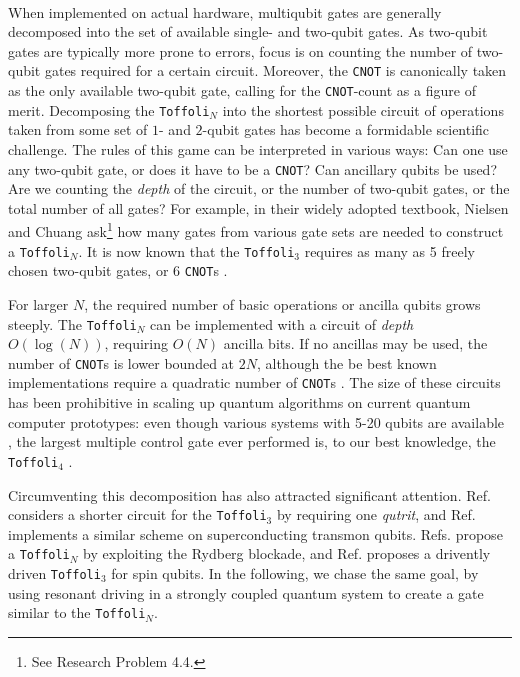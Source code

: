 \paragraph{} When implemented on actual hardware, multiqubit gates are generally decomposed into the set of available single- and two-qubit gates. As two-qubit gates are typically more prone to errors, focus is on counting the number of two-qubit gates required for a certain circuit. Moreover, the \texttt{CNOT} is canonically taken as the only available two-qubit gate, calling for the \texttt{CNOT}-count as a figure of merit. Decomposing the \texttt{Toffoli}$_N$ into the shortest possible circuit of operations taken from some set of $1$- and $2$-qubit gates has become a formidable scientific challenge. The rules of this game can be interpreted in various ways: Can one use any two-qubit gate, or does it have to be a \texttt{CNOT}? Can ancillary qubits be used? Are we counting the \emph{depth} of the circuit, or the number of two-qubit gates, or the total number of all gates?
For example, in their widely adopted textbook, Nielsen and Chuang \cite{Nielsen2010} ask\footnote{See Research Problem 4.4.} how many gates from various gate sets are needed to construct a \texttt{Toffoli}$_N$. It is now known that the \texttt{Toffoli}$_3$ requires as many as 5 freely chosen two-qubit gates, or 6 \texttt{CNOT}s \cite{Yu2013}. 

For larger $N$, the required number of basic operations or ancilla qubits grows steeply. The \texttt{Toffoli}$_N$ can be implemented with a circuit of \emph{depth} $O(\log(N))$, requiring $O(N)$ ancilla bits. If no ancillas may be used, the number of \texttt{CNOT}s is lower bounded at $2N$, although the be best known implementations require a quadratic number of \texttt{CNOT}s \cite{Shende2009}. The size of these circuits has been prohibitive in scaling up quantum algorithms on current quantum computer prototypes: even though various systems with 5-20 qubits are available \cite{Roushan2017,Otterbach2017,Landsman2019,Aron2019}, the largest multiple control gate ever performed is, to our best knowledge, the \texttt{Toffoli}$_4$ \cite{Figgatt2017}. 

Circumventing this decomposition has also attracted significant attention. Ref. \cite{Ralph2007} considers a shorter circuit for the \texttt{Toffoli}$_3$ by requiring one \emph{qutrit}, and Ref. \cite{Fedorov2012} implements a similar scheme on superconducting transmon qubits. Refs. \cite{Isenhower2011,Shi2018} propose a \texttt{Toffoli}$_N$ by exploiting the Rydberg blockade, and Ref. \cite{Gullans2019} proposes a drivently driven \texttt{Toffoli}$_3$ for spin qubits. In the following, we chase the same goal, by using resonant driving in a strongly coupled quantum system to create a gate similar to the \texttt{Toffoli}$_N$.


